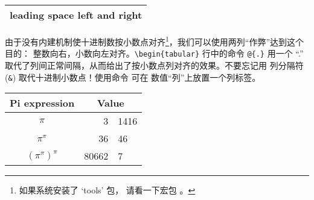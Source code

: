 \begin{example}
\begin{tabular}{l}
\hline
leading space left and right\\
\hline
\end{tabular}
\end{example}

%
%

%
由于没有内建机制使十进制数按小数点对齐\footnote{如果系统安装了 `tools' 包，
请看一下宏包 。}，我们可以使用两列“作弊”达到这个目的：
整数向右，小数向左对齐。\verb|\begin{tabular}| 行中的命令 \verb|@{.}| 用一个
 ``.'' 取代了列间正常间隔，从而给出了按小数点列对齐的效果。不要忘记用
列分隔符 (\verb|&|) 取代十进制小数点！使用命令  可在
数值“列”上放置一个列标签。

\begin{example}
\begin{tabular}{c r @{.} l}
Pi expression       &
\multicolumn{2}{c}{Value} \\
\hline
$\pi$               & 3&1416  \\
$\pi^{\pi}$         & 36&46   \\
$(\pi^{\pi})^{\pi}$ & 80662&7 \\
\end{tabular}
\end{example}

